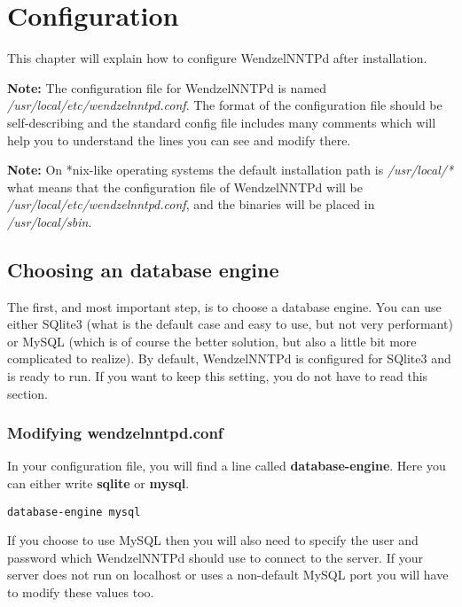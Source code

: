 \chapter{Configuration}

This chapter will explain how to configure WendzelNNTPd after installation.

{\bf Note:} The configuration file for WendzelNNTPd is named {\it /usr/local/etc/wendzelnntpd.conf}. The format of the configuration file should be self-describing and the standard config file includes many comments which will help you to understand the lines you can see and modify there.

{\bf Note:} On *nix-like operating systems the default installation path is {\it /usr/local/*} what means that the configuration file of WendzelNNTPd will be {\it /usr/local/etc/wendzelnntpd.conf}, and the binaries will be placed in {\it /usr/local/sbin}. %

\section{Choosing an database engine}

The first, and most important step, is to choose a database engine. You can use either SQlite3 (what is the default case and easy to use, but not very performant) or MySQL (which is of course the better solution, but also a little bit more complicated to realize). By default, WendzelNNTPd is configured for SQlite3 and is ready to run. If you want to keep this setting, you do not have to read this section.

\subsection{Modifying wendzelnntpd.conf}

In your configuration file, you will find a line called {\bf database-engine}. Here you can either write {\bf sqlite} or {\bf mysql}.

\begin{verbatim}
database-engine mysql
\end{verbatim}

If you choose to use MySQL then you will also need to specify the user and password which WendzelNNTPd should use to connect to the server. If your server does not run on localhost or uses a non-default MySQL port you will have to modify these values too.

